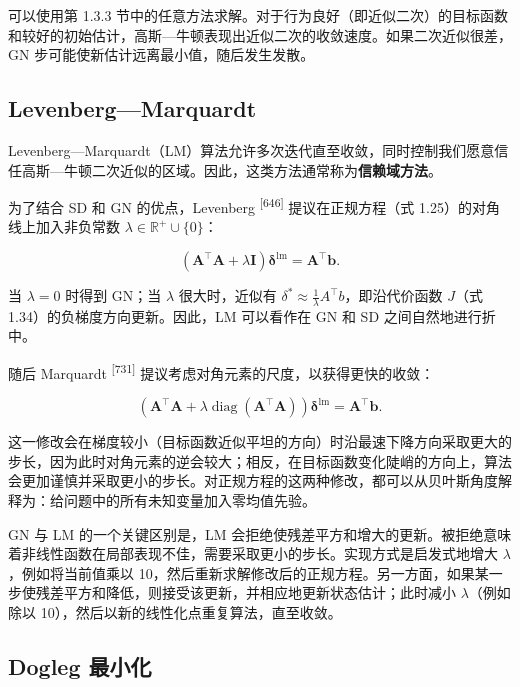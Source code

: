 可以使用第 1.3.3 节中的任意方法求解。对于行为良好（即近似二次）的目标函数和较好的初始估计，高斯—牛顿表现出近似二次的收敛速度。如果二次近似很差，GN 步可能使新估计远离最小值，随后发生发散。

\subsection{Levenberg—Marquardt}

Levenberg—Marquardt（LM）算法允许多次迭代直至收敛，同时控制我们愿意信任高斯—牛顿二次近似的区域。因此，这类方法通常称为\textbf{信赖域方法}。

为了结合 SD 和 GN 的优点，Levenberg \textsuperscript{[646]} 提议在正规方程（式 1.25）的对角线上加入非负常数 $\lambda\in\mathbb{R}^+\cup\{0\}$：

\begin{equation}
\left(\boldsymbol {A} ^ {\top} \boldsymbol {A} + \lambda \mathbf {I}\right) \boldsymbol {\delta} ^ {\mathrm{lm}} = \boldsymbol {A} ^ {\top} \boldsymbol {b}.\tag{1.37}
\end{equation}

当 $\lambda=0$ 时得到 GN；当 $\lambda$ 很大时，近似有 $\delta^*\approx\frac1\lambda A^\top b$，即沿代价函数 $J$（式 1.34）的负梯度方向更新。因此，LM 可以看作在 GN 和 SD 之间自然地进行折中。

随后 Marquardt \textsuperscript{[731]} 提议考虑对角元素的尺度，以获得更快的收敛：

\begin{equation}
\left(\boldsymbol {A} ^ {\top} \boldsymbol {A} + \lambda \operatorname{diag} (\boldsymbol {A} ^ {\top} \boldsymbol {A})\right) \boldsymbol {\delta} ^ {\mathrm{lm}} = \boldsymbol {A} ^ {\top} \boldsymbol {b}.\tag{1.38}
\end{equation}

这一修改会在梯度较小（目标函数近似平坦的方向）时沿最速下降方向采取更大的步长，因为此时对角元素的逆会较大；相反，在目标函数变化陡峭的方向上，算法会更加谨慎并采取更小的步长。对正规方程的这两种修改，都可以从贝叶斯角度解释为：给问题中的所有未知变量加入零均值先验。

GN 与 LM 的一个关键区别是，LM 会拒绝使残差平方和增大的更新。被拒绝意味着非线性函数在局部表现不佳，需要采取更小的步长。实现方式是启发式地增大 $\lambda$，例如将当前值乘以 10，然后重新求解修改后的正规方程。另一方面，如果某一步使残差平方和降低，则接受该更新，并相应地更新状态估计；此时减小 $\lambda$（例如除以 10），然后以新的线性化点重复算法，直至收敛。

\subsection{Dogleg 最小化}

